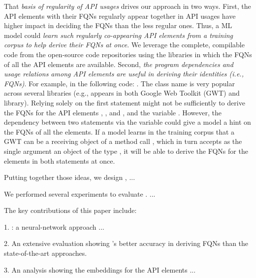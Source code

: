 That {\em basis of regularity of API usages} drives our approach in
two ways. First, the API elements with their FQNs regularly appear
together in API usages have higher impact in deciding the FQNs than
the less regular ones. Thus, a ML model could {\em learn such
  regularly co-appearing API elements from a training corpus to help
  derive their FQNs at once}. We leverage the complete, compilable
code from the open-source code repositories using the libraries in
which the FQNs of all the API elements are available. Second, {\em the
  program dependencies and usage relations among API elements are
  useful in deriving their identities (i.e., FQNs)}. For example, in
the following code: 
. The class name
 is very popular across several libraries (e.g.,
 appears in both Google Web Toolkit (GWT) and
 library). Relying solely on the first statement might
not be sufficiently to derive the FQNs for the API elements
, , and , and
the variable . However, the  dependency between
two statements via the variable  could give a model a hint on
the FQNs of all the elements.  If a model learns in the training
corpus that a GWT  can be a receiving object of a method
call , which in turn accepts as the single
argument an object of the type , it will be able to
derive the FQNs for the elements in both statements at once.

Putting together those ideas, we design {\tool}, ...

We performed several experiments to evaluate {\tool}. ...

The key contributions of this paper include:

1. {\tool}: a neural-network approach ...


2. An extensive evaluation showing {\tool}'s better accuracy in
deriving FQNs than the state-of-the-art approaches.

3. An analysis showing the embeddings for the API elements ...

